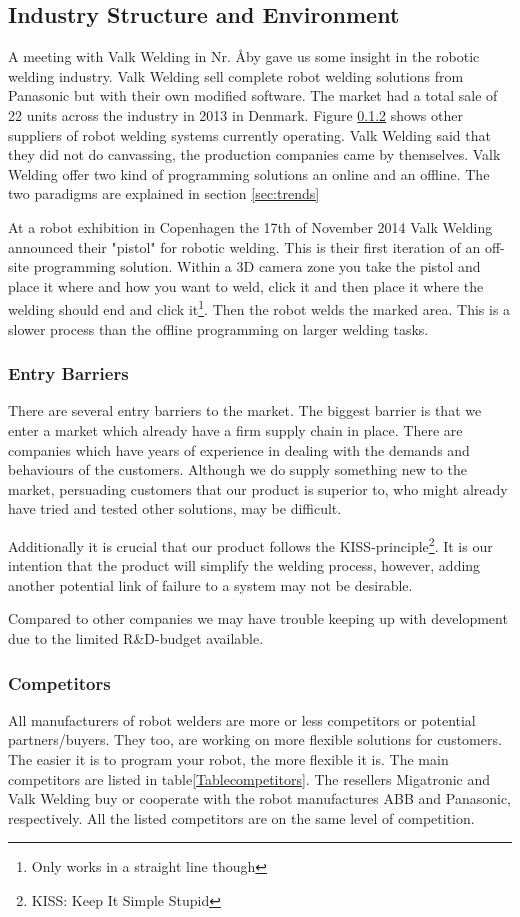 \subsection{Industry Structure and Environment}
\label{ind.struc}
A meeting with Valk Welding in Nr. Åby\cite{valk_welding_summary} gave us some insight in the robotic welding industry. 
Valk Welding sell complete robot welding solutions from Panasonic but with their own modified software. The market had a total sale of 22 units across the industry in 2013 in Denmark. Figure \ref{competitors} shows other suppliers of robot welding systems currently operating. 
Valk Welding said that they did not do canvassing, the production companies came by themselves. Valk Welding offer two kind of programming solutions an online and an offline. The two paradigms are explained in section \ref{sec:trends}

At a robot exhibition in Copenhagen the 17th of November 2014 Valk Welding announced their "pistol" for robotic welding. This is their first iteration of an off-site programming solution. Within a 3D camera zone you take the pistol and place it where and how you want to weld, click it and then place it where the welding should end and click it\footnote{Only works in a straight line though}. Then the robot welds the marked area. This is a slower process than the offline programming on larger welding tasks.
\subsubsection{Entry Barriers}
There are several entry barriers to the market. The biggest barrier is that we enter a market which already have a firm supply chain in place. There are companies which have years of experience in dealing with the demands and behaviours of the customers. Although we do supply something new to the market, persuading customers that our product is superior to, who might already have tried and tested other solutions, may be difficult.

Additionally it is crucial that our product follows the KISS-principle\footnote{KISS: Keep It Simple Stupid}. It is our intention that the product will simplify the welding process, however, adding another potential link of failure to a system may not be desirable.

Compared to other companies we may have trouble keeping up with development due to the limited R\&D-budget available.
\subsubsection{Competitors}
\label{competitors}
All manufacturers of robot welders are more or less competitors or potential partners/buyers. They too, are working on more flexible solutions for customers. The easier it is to program your robot, the more flexible it is. The main competitors are listed in table\ref{Tablecompetitors}. The resellers Migatronic and Valk Welding buy or cooperate with the robot manufactures ABB and Panasonic, respectively. All the listed competitors are on the same level of competition.

